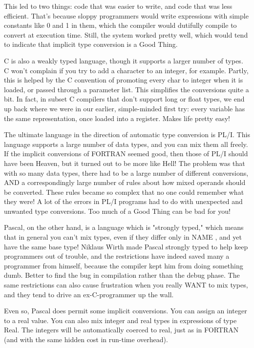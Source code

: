 This  led to two things:  code that was easier to write, and code that was less efficient. That's because sloppy programmers would write expressions with simple  constants  like  0  and 1 in them, which  the  compiler  would  dutifully  compile  to   convert  at execution  time. Still, the system  worked  pretty  well, which would  tend  to  indicate that implicit type conversion is a Good Thing.

C is also a weakly typed language, though it  supports  a  larger number  of types. C won't complain if you try to add a character to an integer, for  example. Partly, this is helped by the C convention of promoting every char  to integer when it is loaded, or  passed  through  a  parameter  list. This  simplifies  the conversions quite a  bit. In  fact, in subset C compilers that don't support long or float types, we  end up back where we were in our earlier, simple-minded  first try: every variable has the same representation, once loaded into  a  register. Makes life pretty easy!

The  ultimate  language  in  the  direction  of   automatic  type conversion is PL/I. This  language  supports  a large number of data types, and you can mix them all  freely. If  the implicit conversions of FORTRAN seemed good, then  those  of  PL/I should have been Heaven, but it turned  out  to  be more like Hell!  The problem was that with so many data types, there had to be a large number  of  different conversions, AND  a  correspondingly  large number of rules about how  mixed  operands  should  be converted. These rules became so  complex  that  no  one could remember what they  were!  A lot of the errors in PL/I programs had to do  with unexpected and unwanted type  conversions. Too  much of a Good Thing can be bad for you!

Pascal, on  the  other hand, is a  language  which  is "strongly typed," which means that in general you can't mix types, even if they differ only in  NAME , and yet have the same base type!  Niklaus Wirth made Pascal strongly typed to help keep programmers out of trouble, and  the  restrictions  have  indeed saved many a programmer from himself, because the compiler kept him from doing something dumb. Better  to  find  the  bug in compilation rather than  the  debug  phase. The same restrictions can also  cause frustration when you really  WANT  to mix types, and they tend to drive an ex-C-programmer up the wall.

Even so, Pascal does permit some implicit conversions. You can assign  an integer to a real value. You can also mix integer and real types in  expressions  of  type  Real. The integers will be automatically coerced to real, just as in FORTRAN  (and  with the same hidden cost in run-time overhead).

